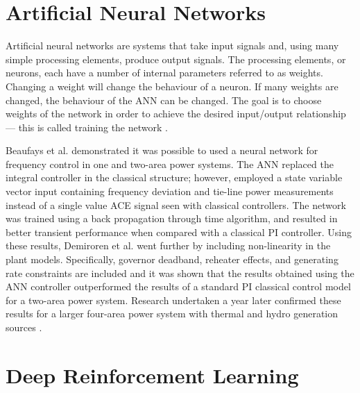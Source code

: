 \section{Artificial Neural Networks}
Artificial neural networks are systems that take input signals and, using many simple processing elements, produce output signals. The processing elements, or neurons, each have a number of internal parameters referred to as weights. Changing a weight will change the behaviour of a neuron. If many weights are changed, the behaviour of the ANN can be changed. The goal is to choose weights of the network in order to achieve the desired input/output relationship --- this is called training the network \cite{Nguyen1990}.

Beaufays et al. \cite{Beaufays1994} demonstrated it was possible to used a neural network for frequency control in one and two-area power systems. The ANN replaced the integral controller in the classical structure; however, employed a state variable vector input containing frequency deviation and tie-line power measurements instead of a single value ACE signal seen with classical controllers. The network was trained using a back propagation through time algorithm, and resulted in better transient performance when compared with a classical PI controller. Using these results, Demiroren et al. \cite{Demiroren2001} went further by including non-linearity in the plant models. Specifically, governor deadband, reheater effects, and generating rate constraints are included and it was shown that the results obtained using the ANN controller outperformed the results of a standard PI classical control model for a two-area power system. Research undertaken a year later confirmed these results for a larger four-area power system with thermal and hydro generation sources \cite{Zeynelgil2002}. 


\section{Deep Reinforcement Learning}
